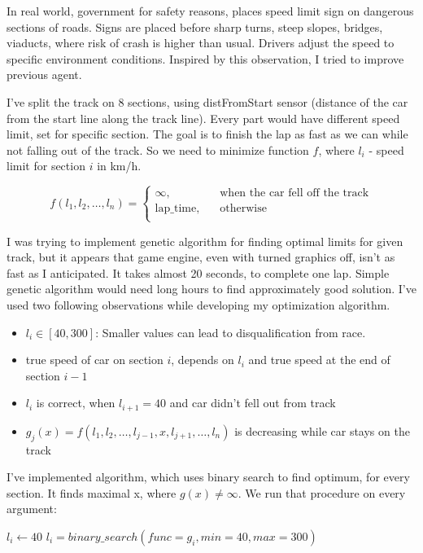 \documentclass[declaration,shortabstract,english,inz]{iithesis}
\begin{document}
In real world, government for safety reasons, places speed limit sign on dangerous sections of roads.
Signs are placed before sharp turns, steep slopes, bridges, viaducts, where risk of crash is higher than usual.
Drivers adjust the speed to specific environment conditions.
Inspired by this observation, I tried to improve previous agent.


I've split the track on 8 sections, using distFromStart sensor (distance of the car from the start line along the track line).
Every part would have different speed limit, set for specific section.
The goal is to finish the lap as fast as we can while not falling out of the track.
So we need to minimize function $f$, where $l_i$ - speed limit for section $i$ in km/h.

$$ f(l_1, l_2, \dots, l_n ) =  \begin{cases}
    \infty, &\quad \text{when the car fell off the track}\\
    \text{lap\_time}, &\quad \text{otherwise} \\
  \end{cases}
 $$

I was trying to implement genetic algorithm for finding optimal limits for given track, but it appears that game engine, even with turned graphics off, isn't as fast as I anticipated.
It takes almost 20 seconds, to complete one lap.
Simple genetic algorithm would need long hours to find approximately good solution.
I've used two following observations while developing my optimization algorithm.

\begin{itemize}
    \item  $l_i \in [40, 300]$:  Smaller values can lead to disqualification from race.
    \item  true speed of car on section $i$, depends on $l_i$ and true speed at the end of section $i-1$
    \item
    $l_i$ is correct, when $l_{i+1} = 40$ and car didn't fell out from track
    \item  $g_j(x) = f(l_1,l_2, \dots,l_{j-1}, x, l_{j+1}, \dots, l_n)$ is decreasing while car stays on the track
    
\end{itemize}


I've implemented algorithm, which uses binary search to find optimum, for every section.
It finds maximal x, where $g(x) \neq \infty$.
We run that procedure on every argument:

\begin{algorithmic}
    \STATE $l_i\gets 40$
        \STATE $l_i = binary\_search(func=g_i, min=40, max=300)$
    \ENDFOR
\end{algorithmic}
\end{document}
